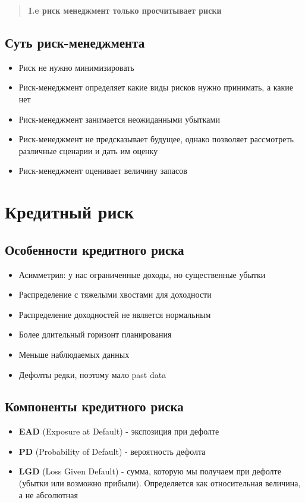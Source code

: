 \documentclass{article}
\begin{document}
            \begin{quote}
                \textbf{I.e риск менеджмент только просчитывает риски}
            \end{quote}

        \subsection{Суть риск-менеджмента}
            \begin{itemize}
                \item Риск не нужно минимизировать
                \item Риск-менеджмент определяет какие виды рисков нужно принимать, а какие нет
                \item Риск-менеджмент занимается неожиданными убытками
                \item Риск-менеджмент не предсказывает будущее, однако позволяет рассмотреть различные сценарии и дать им оценку
                \item Риск-менеджмент оценивает величину запасов
            \end{itemize}
    \section{Кредитный риск}
        \subsection{Особенности кредитного риска}
            \begin{itemize}
                \item Асимметрия: у нас ограниченные доходы, но существенные убытки
                \item Распределение с тяжелыми хвостами для доходности
                \item Распределение доходностей не является нормальным
                \item Более длительный горизонт планирования
                \item Меньше наблюдаемых данных
                \item Дефолты редки, поэтому мало past data
            \end{itemize}

        \subsection{Компоненты кредитного риска}
            \begin{itemize}
                \item \textbf{EAD} (Exposure at Default) - экспозиция при дефолте
                \item \textbf{PD} (Probability of Default) - вероятность дефолта
                \item \textbf{LGD} (Loss Given Default) - сумма, которую мы получаем при дефолте (убытки или возможно прибыли). Определяется как относительная величина, а не абсолютная
            \end{itemize}
\end{document}
